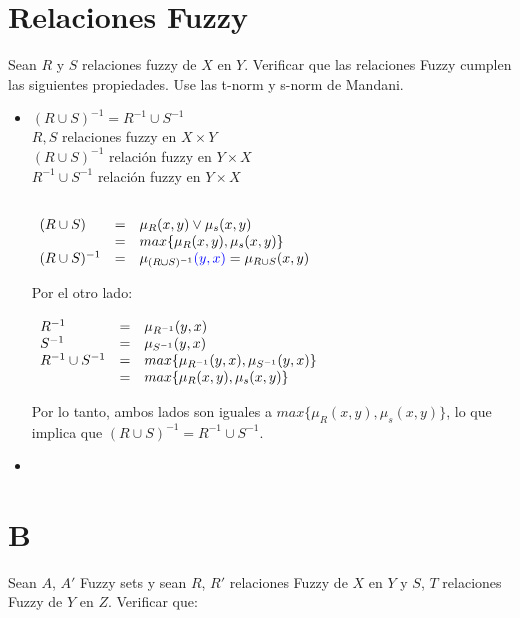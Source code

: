 \documentclass[letterpaper,spanish,11pt]{article}
\begin{document}
\section{Relaciones Fuzzy}
Sean $R$ y $S$ relaciones fuzzy de $X$ en $Y$. Verificar que las relaciones Fuzzy cumplen las siguientes propiedades. Use las t-norm y s-norm de Mandani.

\begin{itemize}
\item $(R \cup S )^{-1} = R^{-1} \cup S^{-1}$\\
$R,S$ relaciones fuzzy en $X\times Y$\\
$(R\cup S)^{-1}$ relaci\'{o}n fuzzy en $Y\times X$\\
$R^{-1}\cup S^{-1}$ relaci\'{o}n fuzzy en $Y\times X$



$\begin{array}{l l l}\\
(R \cup S ) &= &\mu_{R}(x,y) \vee \mu_{s}(x,y)\\
 &= &max\{\mu_{R}(x,y),\mu_{s}(x,y)\}\\
(R \cup S )^{-1} &= & \mu_{(R\cup S)^{-1}}\textcolor{blue}{(y,x)} = \mu_{R\cup S}(x,y)\\
\end{array}$

Por el otro lado:\\

$\begin{array}{l l l}\\
R^{-1} &= &\mu_{R^{-1}}(y,x)\\
S^{-1} &= &\mu_{S^{-1}}(y,x)\\
R^{-1} \cup S^{-1}  &= &max\{\mu_{R^{-1}}(y,x),\mu_{S^{-1}}(y,x)\}\\
 &= & max\{\mu_{R}(x,y),\mu_{s}(x,y)\}
\end{array}$

Por lo tanto, ambos lados son iguales a $max\{\mu_{R}(x,y),\mu_{s}(x,y)\}$, lo
que implica que $(R \cup S )^{-1} = R^{-1} \cup S^{-1}$.

\item 

\end{itemize}

\section{B}
 Sean $A$, $A'$ Fuzzy sets y sean $R$, $R'$ relaciones Fuzzy de $X$ en $Y$ y $S$, $T$ relaciones Fuzzy de $Y$ en $Z$. Verificar que:





\end{document}

